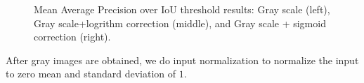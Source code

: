 \documentclass[runningheads]{llncs}
\begin{document}
\begin{figure}[ht]
	\centering
	\setlength{\fboxrule}{0.0pt}
	\caption{Mean Average Precision over IoU threshold results: Gray scale (left), Gray scale+logrithm correction (middle), and Gray scale + sigmoid correction (right).}
	\label{fig:prep}
\end{figure}
After gray images are obtained, we do input normalization to normalize the input to zero mean and standard deviation of $1$. 
\end{document}
